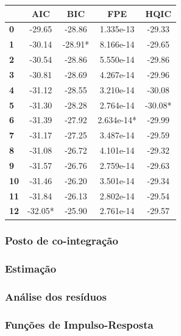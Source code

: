 \documentclass[a4paper,
               article,
               12pt,
               openany,
               oneside,
               english,
               brazil]{abntex2}
\numberwithin{equation}{section}
\begin{document}
    \begin{table}[ht]
        {%
            \begin{tabular}{lcccc}
                & \textbf{AIC} & \textbf{BIC} & \textbf{FPE} & \textbf{HQIC}  \\
                \midrule
                \textbf{0}  &      -29.65  &      -28.86  &   1.335e-13  &       -29.33   \\
                \textbf{1}  &      -30.14  &     -28.91*  &   8.166e-14  &       -29.65   \\
                \textbf{2}  &      -30.54  &      -28.86  &   5.550e-14  &       -29.86   \\
                \textbf{3}  &      -30.81  &      -28.69  &   4.267e-14  &       -29.96   \\
                \textbf{4}  &      -31.12  &      -28.55  &   3.210e-14  &       -30.08   \\
                \textbf{5}  &      -31.30  &      -28.28  &   2.764e-14  &      -30.08*   \\
                \textbf{6}  &      -31.39  &      -27.92  &  2.634e-14*  &       -29.99   \\
                \textbf{7}  &      -31.17  &      -27.25  &   3.487e-14  &       -29.59   \\
                \textbf{8}  &      -31.08  &      -26.72  &   4.101e-14  &       -29.32   \\
                \textbf{9}  &      -31.57  &      -26.76  &   2.759e-14  &       -29.63   \\
                \textbf{10} &      -31.46  &      -26.20  &   3.501e-14  &       -29.34   \\
                \textbf{11} &      -31.84  &      -26.13  &   2.802e-14  &       -29.54   \\
                \textbf{12} &     -32.05*  &      -25.90  &   2.761e-14  &       -29.57   \\
                \midrule
            \end{tabular}
        } 
        {}
    \end{table}

    \subsubsection{Posto de co-integração}

    \subsubsection{Estimação}

    \subsubsection{Análise dos resíduos}

    \subsubsection{Funções de Impulso-Resposta}
    

\newpage
% 
\printbibliography
\end{document}
